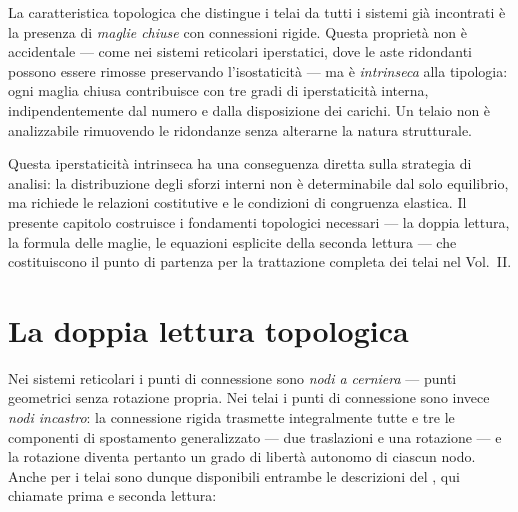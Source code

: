 La caratteristica topologica che distingue i telai da
tutti i sistemi già incontrati è la presenza di
\emph{maglie chiuse} con connessioni rigide. Questa
proprietà non è accidentale --- come nei sistemi
reticolari iperstatici, dove le aste ridondanti possono
essere rimosse preservando l'isostaticità --- ma è
\emph{intrinseca} alla tipologia: ogni maglia chiusa
contribuisce con tre gradi di iperstaticità interna,
indipendentemente dal numero e dalla disposizione dei
carichi. Un telaio non è analizzabile rimuovendo le
ridondanze senza alterarne la natura strutturale.

Questa iperstaticità intrinseca ha una conseguenza
diretta sulla strategia di analisi: la distribuzione
degli sforzi interni non è determinabile dal solo
equilibrio, ma richiede le relazioni costitutive e
le condizioni di congruenza elastica. Il presente
capitolo costruisce i fondamenti topologici necessari
--- la doppia lettura, la formula delle maglie,
le equazioni esplicite della seconda lettura ---
che costituiscono il punto di partenza per la
trattazione completa dei telai nel Vol.~II.


\section{La doppia lettura topologica}
\label{sec:telai_doppia_lettura}

Nei sistemi reticolari i punti di connessione
sono \emph{nodi a cerniera} --- punti geometrici
senza rotazione propria. Nei telai i punti di
connessione sono invece \emph{nodi incastro}:
la connessione rigida trasmette integralmente
tutte e tre le componenti di spostamento
generalizzato --- due traslazioni e una rotazione
--- e la rotazione diventa pertanto un grado di
libertà autonomo di ciascun nodo. Anche per i telai
sono dunque disponibili entrambe le descrizioni del
, qui chiamate prima e
seconda lettura:

